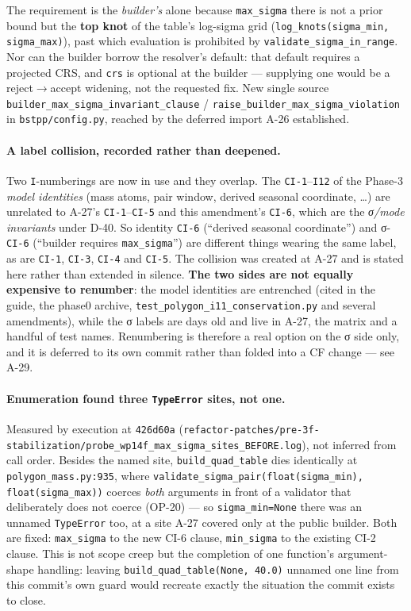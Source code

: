 \documentclass[
  10pt,
]{article}
\begin{document}
The requirement is the \emph{builder's} alone because \texttt{max\_sigma} there is not a prior bound but the \textbf{top knot} of the table's log-sigma grid (\texttt{log\_knots(sigma\_min, sigma\_max)}), past which evaluation is prohibited by \texttt{validate\_sigma\_in\_range}. Nor can the builder borrow the resolver's default: that default requires a projected CRS, and \texttt{crs} is optional at the builder --- supplying one would be a reject$\rightarrow$accept widening, not the requested fix. New single source \texttt{builder\_max\_sigma\_invariant\_clause} / \texttt{raise\_builder\_max\_sigma\_violation} in \texttt{bstpp/config.py}, reached by the deferred import A-26 established.

\paragraph{A label collision, recorded rather than deepened.}
Two \texttt{I}-numberings are now in use and they overlap. The \texttt{CI-1}--\texttt{I12} of the Phase-3 \emph{model identities} (mass atoms, pair window, derived seasonal coordinate, \ldots{}) are unrelated to A-27's \texttt{CI-1}--\texttt{CI-5} and this amendment's \texttt{CI-6}, which are the \emph{σ/mode invariants} under D-40. So identity \texttt{CI-6} (``derived seasonal coordinate'') and σ-\texttt{CI-6} (``builder requires \texttt{max\_sigma}'') are different things wearing the same label, as are \texttt{CI-1}, \texttt{CI-3}, \texttt{CI-4} and \texttt{CI-5}. The collision was created at A-27 and is stated here rather than extended in silence. \textbf{The two sides are not equally expensive to renumber}: the model identities are entrenched (cited in the guide, the phase0 archive, \texttt{test\_polygon\_i11\_conservation.py} and several amendments), while the σ labels are days old and live in A-27, the matrix and a handful of test names. Renumbering is therefore a real option on the σ side only, and it is deferred to its own commit rather than folded into a CF change --- see A-29.

\paragraph{Enumeration found three \texttt{TypeError} sites, not one.}
Measured by execution at \texttt{426d60a} (\texttt{refactor-patches/\allowbreak{}pre-3f-stabilization/\allowbreak{}probe\_wp14f\_max\_sigma\_sites\_BEFORE.log}), not inferred from call order. Besides the named site, \texttt{build\_quad\_table} dies identically at \texttt{polygon\_mass.py:935}, where \texttt{validate\_sigma\_pair(float(sigma\_min), float(sigma\_max))} coerces \emph{both} arguments in front of a validator that deliberately does not coerce (OP-20) --- so \texttt{sigma\_min=None} there was an unnamed \texttt{TypeError} too, at a site A-27 covered only at the public builder. Both are fixed: \texttt{max\_sigma} to the new CI-6 clause, \texttt{min\_sigma} to the existing CI-2 clause. This is not scope creep but the completion of one function's argument-shape handling: leaving \texttt{build\_quad\_table(None, 40.0)} unnamed one line from this commit's own guard would recreate exactly the situation the commit exists to close.
\end{document}
